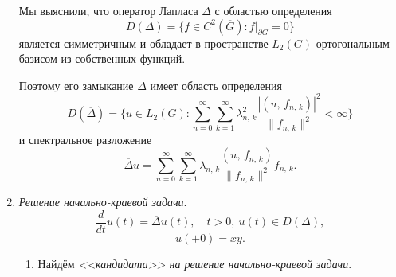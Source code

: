 \documentclass[a4paper]{article}
\begin{document}
\begin{sol}
\begin{enumerate}
Мы выяснили, что оператор Лапласа $\Delta$ с областью
определения
\[
	D(\Delta)= \{f \in C^2 \left( \overline{G} \right) \colon 
	f|_{\partial G}=0\} 
\]
является симметричным и обладает в пространстве $L_2(G)$ 
ортогональным базисом из собственных функций.

Поэтому его замыкание $\overline{\Delta}$ имеет область
определения
\[
	D\left( \overline{\Delta} \right) = \{u \in L_2 (G)\colon 
	\sum_{n=0}^{\infty} \sum_{k=1}^{\infty} \lambda_{n,\,k}^2
\frac{|(u,\,f_{n,\,k})|^2}{\| f_{n,\,k}\|^2}<\infty\} 
\]
и спектральное разложение
\[
\overline{\Delta}u= \sum_{n=0}^{\infty} \sum_{k=1}^{\infty}
\lambda_{n,\,k} \frac{(u,\,f_{n,\,k})}{\| f_{n,\,k}\|^2}f_{n,\,k}
.\] 
\item \emph{Решение начально-краевой задачи}.
\[
	\frac{d}{dt}u(t)=\overline{\Delta}u(t),\quad
	t>0,\ u(t) \in D\left( \Delta \right) ,
\] 
\[
	u(+0)=xy
.\] 
\begin{enumerate}
\item Найдём \emph{<<кандидата>> на решение начально-краевой
	задачи}.


\end{enumerate}
\end{enumerate}
\end{sol}
\end{document}
